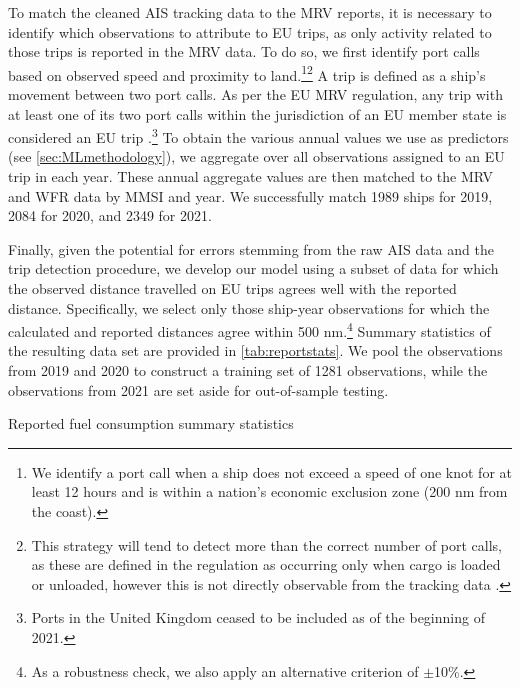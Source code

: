 To match the cleaned \ac{AIS} tracking data to the \ac{MRV} reports, it is necessary to identify which observations to attribute to \ac{EU} trips, as only activity related to those trips is reported in the \ac{MRV} data. To do so, we first identify port calls based on observed speed and proximity to land.\footnote{We identify a port call when a ship does not exceed a speed of one knot for at least 12 hours and is within a nation's economic exclusion zone (200 \ac{nm} from the coast).}\footnote{This strategy will tend to detect more than the correct number of port calls, as these are defined in the regulation as occurring only when cargo is loaded or unloaded, however this is not directly observable from the tracking data \parencite{eu2015regulation}.} A trip is defined as a ship's movement between two port calls. As per the \ac{EU} \ac{MRV} regulation, any trip with at least one of its two port calls within the jurisdiction of an \ac{EU} member state is considered an \ac{EU} trip \parencite{eu2015regulation}.\footnote{Ports in the United Kingdom ceased to be included as of the beginning of 2021.} To obtain the various annual values we use as predictors (see \autoref{sec:MLmethodology}), we aggregate over all observations assigned to an \ac{EU} trip in each year. These annual aggregate values are then matched to the \ac{MRV} and \ac{WFR} data by \ac{MMSI} and year. We successfully match 1989 ships for 2019, 2084 for 2020, and 2349 for 2021.

Finally, given the potential for errors stemming from the raw \ac{AIS} data and the trip detection procedure, we develop our model using a subset of data for which the observed distance travelled on EU trips agrees well with the reported distance. Specifically, we select only those ship-year observations for which the calculated and reported distances agree within 500 \ac{nm}.\footnote{As a robustness check, we also apply an alternative criterion of $\pm$10\%.} Summary statistics of the resulting data set are provided in \autoref{tab:reportstats}. We pool the observations from 2019 and 2020 to construct a training set of 1281 observations, while the observations from 2021 are set aside for out-of-sample testing.

\begin{table}
    \centering
    \begin{threeparttable}
        \caption{Reported fuel consumption summary statistics}
        \label{tab:reportstats}
        
    \end{threeparttable}
\end{table}


